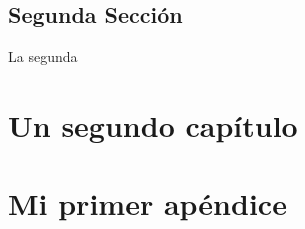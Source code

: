 \documentclass[12pt,a4paper]{book}
\begin{document}
\section{Segunda Secci\'on}
La segunda 

\chapter{Un segundo cap\'itulo}
%
\minitoc%

\section{}
\section{}


\appendix
\chapter{Mi primer ap\'endice}
\end{document}
